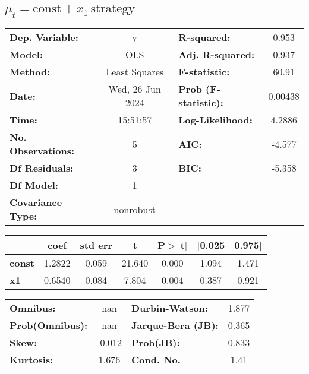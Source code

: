 \documentclass{article}
\begin{document}
\subsection{$\mu_t = \text{const} + x_1\,\text{strategy}$}
\begin{center}
    \begin{tabular}{lclc}
        \toprule
        \textbf{Dep. Variable:}    & y                & \textbf{  R-squared:         } & 0.953   \\
        \textbf{Model:}            & OLS              & \textbf{  Adj. R-squared:    } & 0.937   \\
        \textbf{Method:}           & Least Squares    & \textbf{  F-statistic:       } & 60.91   \\
        \textbf{Date:}             & Wed, 26 Jun 2024 & \textbf{  Prob (F-statistic):} & 0.00438 \\
        \textbf{Time:}             & 15:51:57         & \textbf{  Log-Likelihood:    } & 4.2886  \\
        \textbf{No. Observations:} & 5                & \textbf{  AIC:               } & -4.577  \\
        \textbf{Df Residuals:}     & 3                & \textbf{  BIC:               } & -5.358  \\
        \textbf{Df Model:}         & 1                & \textbf{                     } &         \\
        \textbf{Covariance Type:}  & nonrobust        & \textbf{                     } &         \\
        \bottomrule
    \end{tabular}
    \begin{tabular}{lcccccc}
                       & \textbf{coef} & \textbf{std err} & \textbf{t} & \textbf{P$> |$t$|$} & \textbf{[0.025} & \textbf{0.975]} \\
        \midrule
        \textbf{const} & 1.2822        & 0.059            & 21.640     & 0.000               & 1.094           & 1.471           \\
        \textbf{x1}    & 0.6540        & 0.084            & 7.804      & 0.004               & 0.387           & 0.921           \\
        \bottomrule
    \end{tabular}
    \begin{tabular}{lclc}
        \textbf{Omnibus:}       & nan    & \textbf{  Durbin-Watson:     } & 1.877 \\
        \textbf{Prob(Omnibus):} & nan    & \textbf{  Jarque-Bera (JB):  } & 0.365 \\
        \textbf{Skew:}          & -0.012 & \textbf{  Prob(JB):          } & 0.833 \\
        \textbf{Kurtosis:}      & 1.676  & \textbf{  Cond. No.          } & 1.41  \\
        \bottomrule
    \end{tabular}
\end{center}
\end{document}
